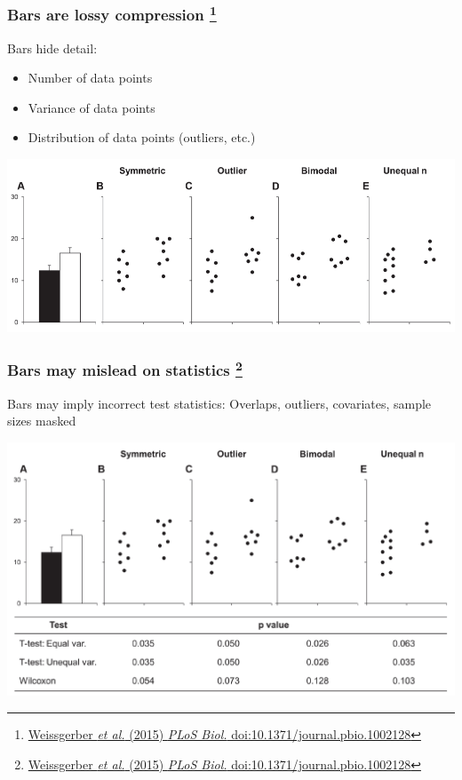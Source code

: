 \begin{frame}
  \frametitle{Bars are lossy compression
  \footnote{\tiny{\href{http://dx.doi.org/10.1371/journal.pbio.1002128}{Weissgerber \textit{et al.} (2015) \textit{PLoS Biol.} doi:10.1371/journal.pbio.1002128}}}
  }
    \begin{alertblock}{Bars hide detail:}
      \begin{itemize}
        \item Number of data points
        \item Variance of data points
        \item Distribution of data points (outliers, etc.)
      \end{itemize}
    \end{alertblock}
    \includegraphics[width=1\textwidth]{images/weissgerber2}  
\end{frame}

\begin{frame}
  \frametitle{Bars may mislead on statistics
  \footnote{\tiny{\href{http://dx.doi.org/10.1371/journal.pbio.1002128}{Weissgerber \textit{et al.} (2015) \textit{PLoS Biol.} doi:10.1371/journal.pbio.1002128}}}
  }
    \begin{alertblock}{Bars may imply incorrect test statistics:}
      Overlaps, outliers, covariates, sample sizes masked
    \end{alertblock}
    \includegraphics[width=1\textwidth]{images/weissgerber3}  
\end{frame}

